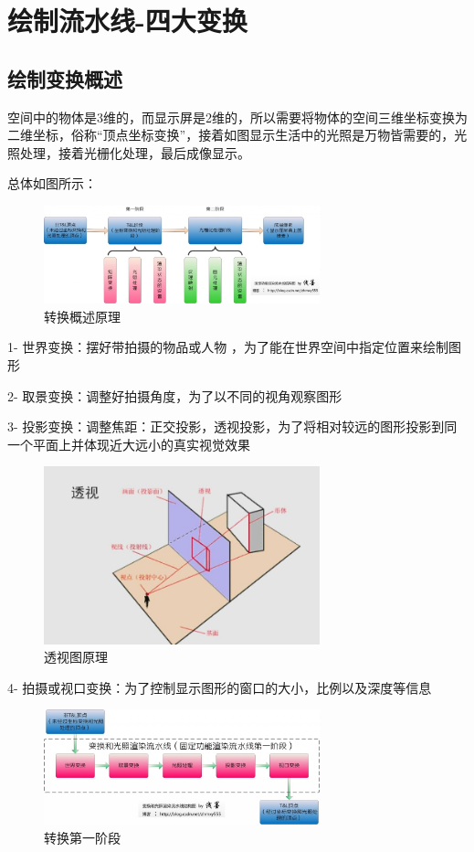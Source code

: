 \documentclass[UTF8,a4paper,8pt]{ctexart}
\begin{document}
 \newpage
 \section{绘制流水线-四大变换}
	 \subsection{绘制变换概述}
		 空间中的物体是3维的，而显示屏是2维的，所以需要将物体的空间三维坐标变换为二维坐标，俗称“顶点坐标变换”，接着如图显示生活中的光照是万物皆需要的，光照处理，接着光栅化处理，最后成像显示。
	 
		 总体如图所示：
		  \begin{figure}[h]
		  	\centering
		  	\includegraphics[angle=0,width=8cm]{introduce.jpg}%
		  	\caption{转换概述原理}
		  	\label{fig:gaishu}
		  \end{figure}%
 
			  1- 世界变换：摆好带拍摄的物品或人物 ，为了能在世界空间中指定位置来绘制图形
	  
			  2- 取景变换：调整好拍摄角度，为了以不同的视角观察图形
	  
			  3- 投影变换：调整焦距：正交投影，透视投影，为了将相对较远的图形投影到同一个平面上并体现近大远小的真实视觉效果
				    \begin{figure}[h]
				    	\centering
				    	\includegraphics[angle=0,width=8cm]{TouShi.jpg}%
				    	\caption{透视图原理}
				    	\label{fig:Toushi}
				    \end{figure}%
  
			  4- 拍摄或视口变换：为了控制显示图形的窗口的大小，比例以及深度等信息      
			  
				   \begin{figure}[h]
					   	\centering
					   	\includegraphics[angle=0,width=8cm]{ChangeOfPointMatrix.jpg}%
					   	\caption{转换第一阶段}
					   	\label{fig:zhuanhuan}
				   \end{figure}%
\end{document}
